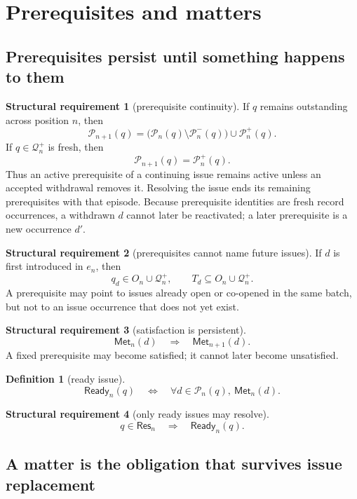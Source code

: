 \documentclass[11pt]{article}
\theoremstyle{definition}
\newtheorem{requirement}{Structural requirement}
\newtheorem*{definition}{Definition}
\theoremstyle{remark}
\newcommand{\Met}{\mathsf{Met}}
\newcommand{\Pre}{\mathcal P}
\newcommand{\Ready}{\mathsf{Ready}}
\newcommand{\ResSet}{\mathsf{Res}}
\newcommand{\Born}{\mathcal Q^{+}}
\begin{document}
\section{Prerequisites and matters}\label{sec:matters}

\subsection{Prerequisites persist until something happens to them}

\begin{requirement}[prerequisite continuity]\label{req:pre-continuity}
If $q$ remains outstanding across position $n$, then
\[
 \Pre_{n+1}(q)
 =\bigl(\Pre_n(q)\setminus\Pre_n^-(q)\bigr)\cup\Pre_n^+(q).
\]
If $q\in\Born_n$ is fresh, then
\[
 \Pre_{n+1}(q)=\Pre_n^+(q).
\]
Thus an active prerequisite of a continuing issue remains active unless an
accepted withdrawal removes it. Resolving the issue ends its remaining
prerequisites with that episode. Because prerequisite identities are fresh
record occurrences, a withdrawn $d$ cannot later be reactivated; a later
prerequisite is a new occurrence $d'$.
\end{requirement}

\begin{requirement}[prerequisites cannot name future issues]\label{req:pre-refs}
If $d$ is first introduced in $e_n$, then
\[
 q_d\in O_n\cup\Born_n,
 \qquad
 T_d\subseteq O_n\cup\Born_n.
\]
A prerequisite may point to issues already open or co-opened in the same
batch, but not to an issue occurrence that does not yet exist.
\end{requirement}

\begin{requirement}[satisfaction is persistent]\label{req:met}
\[
 \Met_n(d)\quad\Longrightarrow\quad\Met_{n+1}(d).
\]
A fixed prerequisite may become satisfied; it cannot later become unsatisfied.
\end{requirement}

\begin{definition}[ready issue]
\[
 \Ready_n(q)
 \quad\Longleftrightarrow\quad
 \forall d\in\Pre_n(q),\ \Met_n(d).
\]
\end{definition}

\begin{requirement}[only ready issues may resolve]\label{req:ready}
\[
 q\in\ResSet_n\quad\Longrightarrow\quad\Ready_n(q).
\]
\end{requirement}

\subsection{A matter is the obligation that survives issue replacement}
\end{document}
